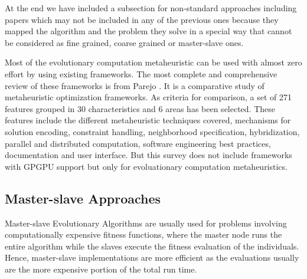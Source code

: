 \documentclass[prodmode,acmtecs]{acmsmall}
\begin{document}
At the end we have included a subsection for non-standard approaches \cite{DBLP:conf/gecco/PospichalMOSJ11} including  papers which may not be included in any of the previous ones because they mapped the algorithm and the problem they solve in a special way that cannot be considered as fine grained, coarse grained or master-slave ones.


Most of the evolutionary computation metaheuristic can be used with almost zero effort by using existing frameworks. The most complete and comprehensive review of these frameworks is from Parejo \cite{springerlink:10.1007/s00500-011-0754-8}. It is a comparative study of metaheuristic optimization frameworks. As criteria for comparison, a set of 271 features grouped in 30 characteristics and 6 areas has been selected. These features include the different metaheuristic techniques covered, mechanisms for solution encoding, constraint handling, neighborhood specification, hybridization, parallel and distributed computation, software engineering best practices, documentation and user interface. But this survey does not include frameworks with GPGPU support but only for evoluationary computation metaheuristics. 


\subsection{Master-slave Approaches}

Master-slave Evolutionary Algorithms are usually used for problems involving computationally expensive fitness functions, where the master node runs the entire algorithm while the slaves execute the fitness evaluation of the individuals. Hence, master-slave implementations are more efficient as the evaluations usually are the more expensive portion of the total run time.
\end{document}
